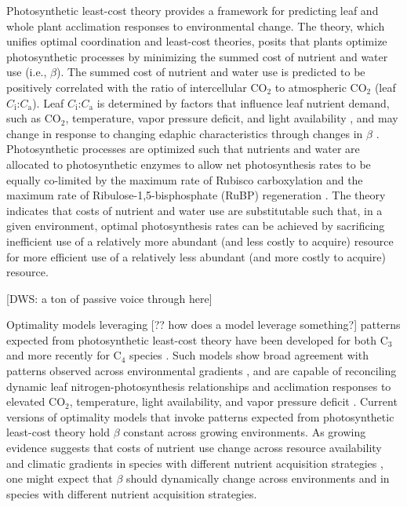 Photosynthetic least-cost theory  provides a framework for predicting leaf and whole plant acclimation responses to environmental change. The theory, which unifies optimal coordination  and least-cost  theories, posits that plants optimize photosynthetic processes by minimizing the summed cost of nutrient and water use (i.e., $\beta$). The summed cost of nutrient and water use is predicted to be positively correlated with the ratio of intercellular CO$_2$ to atmospheric CO$_2$ (leaf $C_\mathrm{i}$:$C_\mathrm{a}$). Leaf $C_\mathrm{i}$:$C_\mathrm{a}$ is determined by factors that influence leaf nutrient demand, such as CO$_2$, temperature, vapor pressure deficit, and light availability , and may change in response to changing edaphic characteristics through changes in $\beta$ . Photosynthetic processes are optimized such that nutrients and water are allocated to photosynthetic enzymes to allow net photosynthesis rates to be equally co-limited by the maximum rate of Rubisco carboxylation and the maximum rate of Ribulose-1,5-bisphosphate (RuBP) regeneration . The theory indicates that costs of nutrient and water use are substitutable such that, in a given environment, optimal photosynthesis rates can be achieved by sacrificing inefficient use of a relatively more abundant (and less costly to acquire) resource for more efficient use of a relatively less abundant (and more costly to acquire) resource.

[DWS: a ton of passive voice through here]

Optimality models leveraging [?? how does a model leverage something?] patterns expected from photosynthetic least-cost theory have been developed for both C$_3$  and more recently for C$_4$ species . Such models show broad agreement with patterns observed across environmental gradients , and are capable of reconciling dynamic leaf nitrogen-photosynthesis relationships and acclimation responses to elevated CO$_2$, temperature, light availability, and vapor pressure deficit . Current versions of optimality models that invoke patterns expected from photosynthetic least-cost theory hold $\beta$ constant across growing environments. As growing evidence suggests that costs of nutrient use change across resource availability and climatic gradients in species with different nutrient acquisition strategies , one might expect that $\beta$ should dynamically change across environments and in species with different nutrient acquisition strategies.

